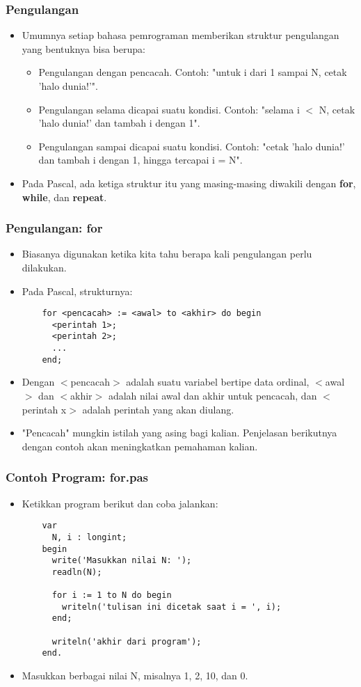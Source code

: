 \begin{frame}
\frametitle{Pengulangan}
\begin{itemize}
  \item Umumnya setiap bahasa pemrograman memberikan struktur pengulangan yang bentuknya bisa berupa:
  \begin{itemize}
    \item Pengulangan dengan pencacah. Contoh: "untuk i dari 1 sampai N, cetak 'halo dunia!'".
    \item Pengulangan selama dicapai suatu kondisi. Contoh: "selama i $<$ N, cetak 'halo dunia!' dan tambah i dengan 1".
    \item Pengulangan sampai dicapai suatu kondisi. Contoh: "cetak 'halo dunia!' dan tambah i dengan 1, hingga tercapai i = N".
  \end{itemize}
  \item Pada Pascal, ada ketiga struktur itu yang masing-masing diwakili dengan \alert{\textbf{for}}, \alert{\textbf{while}}, dan \alert{\textbf{repeat}}.
\end{itemize}
\end{frame}

\begin{frame}[fragile]
\frametitle{Pengulangan: for}
\begin{itemize}
  \item Biasanya digunakan ketika kita tahu berapa kali pengulangan perlu dilakukan.
  \item Pada Pascal, strukturnya:
  \begin{lstlisting}
    for <pencacah> := <awal> to <akhir> do begin
      <perintah 1>;
      <perintah 2>;
      ...
    end;
  \end{lstlisting}
  \item Dengan $<$pencacah$>$ adalah suatu variabel bertipe data \alert{ordinal}, $<$awal$>$ dan $<$akhir$>$ adalah nilai awal dan akhir untuk pencacah, dan $<$perintah x$>$ adalah perintah yang akan diulang.
  \item "Pencacah" mungkin istilah yang asing bagi kalian. Penjelasan berikutnya dengan contoh akan meningkatkan pemahaman kalian.
\end{itemize}
\end{frame}

\begin{frame}[fragile]
\frametitle{Contoh Program: for.pas}
\begin{itemize}
  \item Ketikkan program berikut dan coba jalankan:
  \begin{lstlisting}
    var
      N, i : longint;
    begin
      write('Masukkan nilai N: ');
      readln(N);

      for i := 1 to N do begin
        writeln('tulisan ini dicetak saat i = ', i);
      end;

      writeln('akhir dari program');
    end.
  \end{lstlisting}
  \item Masukkan berbagai nilai N, misalnya 1, 2, 10, dan 0.
\end{itemize}
\end{frame}

